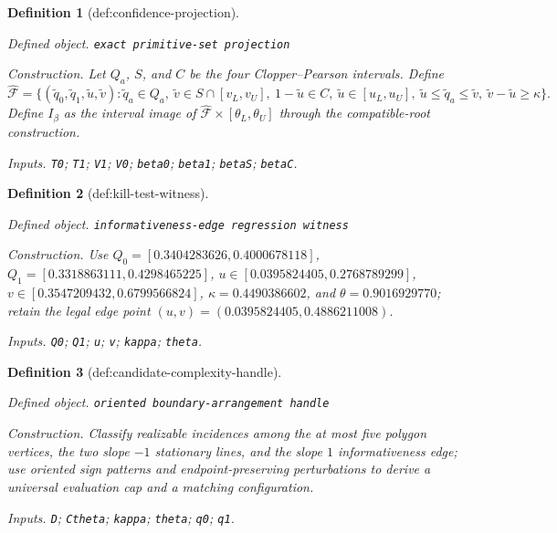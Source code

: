 \documentclass{article}
\newtheorem{definition}{Definition}
\begin{document}
\begin{definition}[def:confidence-projection]\label{def:confidence-projection}
\par\smallskip\noindent\emph{Defined object.} \texttt{exact primitive-\allowbreak{}set projection}
\par\smallskip\noindent\emph{Construction.} Let \(Q_a\), \(S\), and \(C\) be the four Clopper--Pearson intervals. Define \[\widehat{\mathcal F}=\{(\widetilde q_0,\widetilde q_1,\widetilde u,\widetilde v):\widetilde q_a\in Q_a,\ \widetilde v\in S\cap[v_L,v_U],\ 1-\widetilde u\in C,\ \widetilde u\in[u_L,u_U],\ \widetilde u\le\widetilde q_a\le\widetilde v,\ \widetilde v-\widetilde u\ge\kappa\}.\] Define \(I_{\beta}\) as the interval image of \(\widehat{\mathcal F}\times[\theta_L,\theta_U]\) through the compatible-root construction.
\par\smallskip\noindent\emph{Inputs.} \texttt{T0}; \texttt{T1}; \texttt{V1}; \texttt{V0}; \texttt{beta0}; \texttt{beta1}; \texttt{betaS}; \texttt{betaC}.
\end{definition}

\begin{definition}[def:kill-test-witness]\label{def:kill-test-witness}
\par\smallskip\noindent\emph{Defined object.} \texttt{informativeness-\allowbreak{}edge regression witness}
\par\smallskip\noindent\emph{Construction.} Use \(Q_0=[0.3404283626,0.4000678118]\), \(Q_1=[0.3318863111,0.4298465225]\), \(u\in[0.0395824405,0.2768789299]\), \(v\in[0.3547209432,0.6799566824]\), \(\kappa=0.4490386602\), and \(\theta=0.9016929770\); retain the legal edge point \((u,v)=(0.0395824405,0.4886211008)\).
\par\smallskip\noindent\emph{Inputs.} \texttt{Q0}; \texttt{Q1}; \texttt{u}; \texttt{v}; \texttt{kappa}; \texttt{theta}.
\end{definition}

\begin{definition}[def:candidate-complexity-handle]\label{def:candidate-complexity-handle}
\par\smallskip\noindent\emph{Defined object.} \texttt{oriented boundary-\allowbreak{}arrangement handle}
\par\smallskip\noindent\emph{Construction.} Classify realizable incidences among the at most five polygon vertices, the two slope \(-1\) stationary lines, and the slope \(1\) informativeness edge; use oriented sign patterns and endpoint-preserving perturbations to derive a universal evaluation cap and a matching configuration.
\par\smallskip\noindent\emph{Inputs.} \texttt{D}; \texttt{Ctheta}; \texttt{kappa}; \texttt{theta}; \texttt{q0}; \texttt{q1}.
\end{definition}
\end{document}
